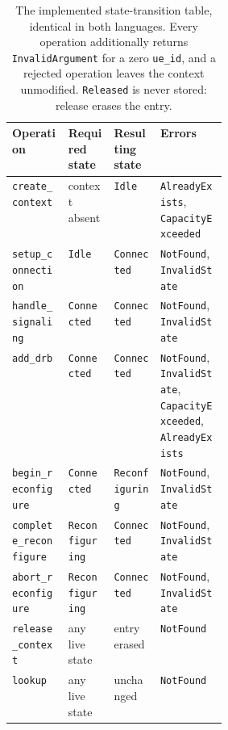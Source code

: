 \documentclass[english,twoside,openright,a4paper,censored,csm,software-track-2020]{HYthesisML}
\begin{document}
\begin{table}
\centering
\small
\caption{The implemented state-transition table, identical in both languages. Every operation
additionally returns \texttt{InvalidArgument} for a zero \texttt{ue\_id}, and a rejected
operation leaves the context unmodified. \texttt{Released} is never stored: release erases
the entry.\label{tab:transitions}}
\begin{tabular}{@{}l l l R{0.31\linewidth}@{}}
\hline\hline
Operation & Required state & Resulting state & Errors \\
\hline
\texttt{create\_context}       & context absent   & \texttt{Idle}          & \texttt{AlreadyExists}, \texttt{CapacityExceeded} \\
\texttt{setup\_connection}     & \texttt{Idle}          & \texttt{Connected}     & \texttt{NotFound}, \texttt{InvalidState} \\
\texttt{handle\_signaling}     & \texttt{Connected}     & \texttt{Connected}     & \texttt{NotFound}, \texttt{InvalidState} \\
\texttt{add\_drb}              & \texttt{Connected}     & \texttt{Connected}     & \texttt{NotFound}, \texttt{InvalidState}, \texttt{CapacityExceeded}, \texttt{AlreadyExists} \\
\texttt{begin\_reconfigure}    & \texttt{Connected}     & \texttt{Reconfiguring} & \texttt{NotFound}, \texttt{InvalidState} \\
\texttt{complete\_reconfigure} & \texttt{Reconfiguring} & \texttt{Connected}     & \texttt{NotFound}, \texttt{InvalidState} \\
\texttt{abort\_reconfigure}    & \texttt{Reconfiguring} & \texttt{Connected}     & \texttt{NotFound}, \texttt{InvalidState} \\
\texttt{release\_context}      & any live state   & entry erased           & \texttt{NotFound} \\
\texttt{lookup}                & any live state   & unchanged              & \texttt{NotFound} \\
\hline
\end{tabular}
\end{table}
\end{document}
